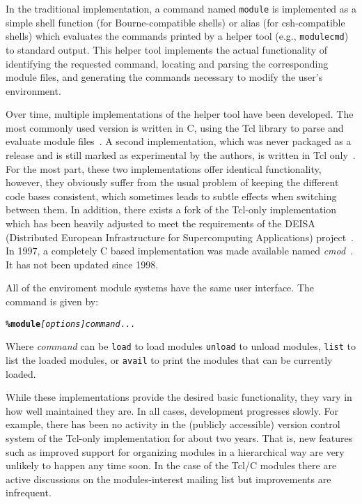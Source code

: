 In the traditional implementation, a command named \texttt{module}
is implemented as a simple shell function (for Bourne-compatible shells) or
alias (for csh-compatible shells) which evaluates the commands printed by a
helper tool (e.g., \texttt{modulecmd}) to standard output. This helper tool
implements the actual functionality of identifying the requested command,
locating and parsing the corresponding module files, and generating the
commands necessary to modify the user's environment.

Over time, multiple implementations of the helper tool
have been developed. The most commonly used version is written in C, using the Tcl
library to parse and evaluate module files~\cite{em}. A second implementation, which
was never packaged as a release and is still marked as experimental by the
authors, is written in Tcl only~\cite{em}. For the most part, these two implementations
offer identical functionality, however, they obviously suffer from the usual
problem of keeping the different code bases consistent, which sometimes leads
to subtle effects when switching between them. In addition, there exists a
fork of the Tcl-only implementation which has been heavily adjusted to meet
the requirements of the DEISA (Distributed European Infrastructure for
Supercomputing Applications) project~\cite{wikiDEISA}.  In
1997, a completely C based implementation was made
available named \emph{cmod}~\cite{cmod}.  It has not been updated since 1998.

All of the enviroment module systems have the same user interface.
The command is given by:
{\small
\begin{alltt}
    \textbf{\% module} \emph{[options]} \emph{command} ...
\end{alltt}
}
\noindent
Where \emph{command} can be \texttt{load} to load modules \texttt{unload}
to unload modules, \texttt{list} to list the loaded modules, or
\texttt{avail} to print the modules that can be currently loaded.



While these implementations provide the desired basic functionality, they
vary in how well maintained they are. In all cases, development
progresses slowly. For example, there has been no activity in the
(publicly accessible) version control system of the Tcl-only
implementation for about two years. That is, new features such as
improved support for organizing modules in a hierarchical way are very
unlikely to happen any time soon. In the case of the Tcl/C modules
there are active discussions on the modules-interest mailing list but
improvements are infrequent.

